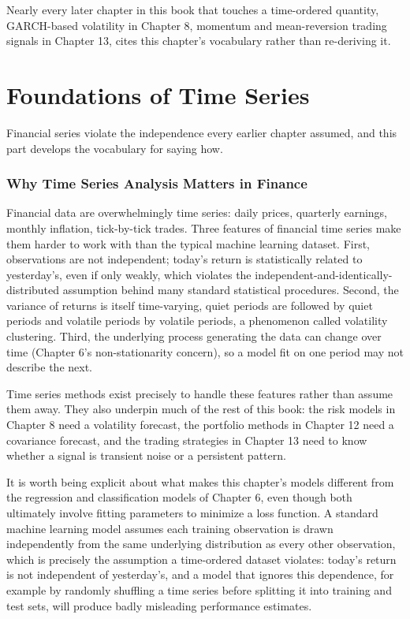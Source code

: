 \documentclass[../ai_in_finance]{subfiles}
\begin{document}
Nearly every later chapter in this book that touches a time-ordered quantity, GARCH-based volatility in Chapter 8, momentum and mean-reversion trading signals in Chapter 13, cites this chapter's vocabulary rather than re-deriving it.

\section{Foundations of Time Series}

Financial series violate the independence every earlier chapter assumed, and this part develops the vocabulary for saying how.

\subsubsection*{Why Time Series Analysis Matters in Finance}

Financial data are overwhelmingly time series: daily prices, quarterly earnings, monthly inflation, tick-by-tick trades. Three features of financial time series make them harder to work with than the typical machine learning dataset. First, observations are not independent; today's return is statistically related to yesterday's, even if only weakly, which violates the independent-and-identically-distributed assumption behind many standard statistical procedures. Second, the variance of returns is itself time-varying, quiet periods are followed by quiet periods and volatile periods by volatile periods, a phenomenon called volatility clustering.
Third, the underlying process generating the data can change over time (Chapter 6's non-stationarity concern), so a model fit on one period may not describe the next.

Time series methods exist precisely to handle these features rather than assume them away. They also underpin much of the rest of this book: the risk models in Chapter 8 need a volatility forecast, the portfolio methods in Chapter 12 need a covariance forecast, and the trading strategies in Chapter 13 need to know whether a signal is transient noise or a persistent pattern.

It is worth being explicit about what makes this chapter's models different from the regression and classification models of Chapter 6, even though both ultimately involve fitting parameters to minimize a loss function. A standard machine learning model assumes each training observation is drawn independently from the same underlying distribution as every other observation, which is precisely the assumption a time-ordered dataset violates: today's return is not independent of yesterday's, and a model that ignores this dependence, for example by randomly shuffling a time series before splitting it into training and test sets, will produce badly misleading performance estimates.
\end{document}
